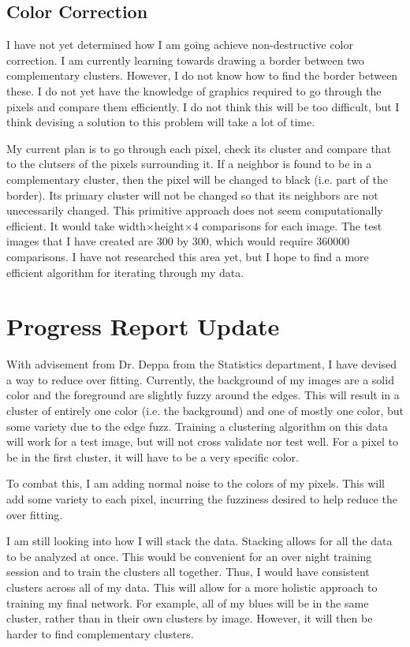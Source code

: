 \documentclass[12pt]{article}
\begin{document}
\subsection{Color Correction}
I have not yet determined how I am going achieve non-destructive color correction. I am currently learning towards drawing a border between two complementary clusters. However, I do not know how to find the border between these. I do not yet have the knowledge of graphics required to go through the pixels and compare them efficiently. I do not think this will be too difficult, but I think devising a solution to this problem will take a lot of time. 

My current plan is to go through each pixel, check its cluster and compare that to the clutsers of the pixels surrounding it. If a neighbor is found to be in a complementary cluster, then the pixel will be changed to black (i.e. part of the border). Its primary cluster will not be changed so that its neighbors are not unecessarily changed. This primitive approach does not seem computationally efficient. It would take width$\times$height$\times 4$ comparisons for each image. The test images that I have created are 300 by 300, which would require 360000 comparisons. I have not researched this area yet, but I hope to find a more efficient algorithm for iterating through my data.

\section{Progress Report Update}

With advisement from Dr. Deppa from the Statistics department, I have devised a way to reduce over fitting. Currently, the background of my images are a solid color and the foreground are slightly fuzzy around the edges. This will result in a cluster of entirely one color (i.e. the background) and one of mostly one color, but some variety due to the edge fuzz. Training a clustering algorithm on this data will work for a test image, but will not cross validate nor test well. For a pixel to be in the first cluster, it will have to be a very specific color.

To combat this, I am adding normal noise to the colors of my pixels. This will add some variety to each pixel, incurring the fuzziness desired to help reduce the over fitting. 

I am still looking into how I will stack the data. Stacking allows for all the data to be analyzed at once. This would be convenient for an over night training session and to train the clusters all together. Thus, I would have consistent clusters across all of my data. This will allow for a more holistic approach to training my final network. For example, all of my blues will be in the same cluster, rather than in their own clusters by image. However, it will then be harder to find complementary clusters.
\end{document}
